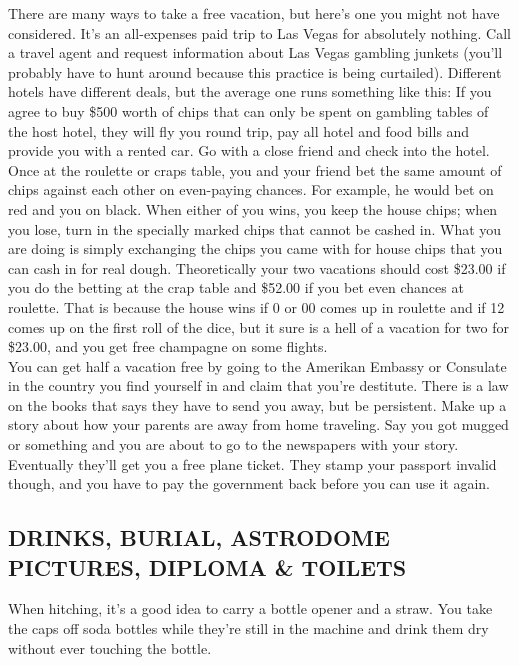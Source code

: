 \documentclass[11pt,twoside,a4paper]{book}
\begin{document}
There are many ways to take a free vacation, but here's one you might not have considered. It's an all-expenses paid trip to Las Vegas for absolutely nothing. Call a travel agent and request information about Las Vegas gambling junkets (you'll probably have to hunt around because this practice is being curtailed). Different hotels have different deals, but the average one runs something like this: If you agree to buy \$500 worth of chips that can only be spent on gambling tables of the host hotel, they will fly you round trip, pay all hotel and food bills and provide you with a rented car. Go with a close friend and check into the hotel. Once at the roulette or craps table, you and your friend bet the same amount of chips against each other on even-paying chances. For example, he would bet on red and you on black. When either of you wins, you keep the house chips; when you lose, turn in the specially marked chips that cannot be cashed in. What you are doing is simply exchanging the chips you came with for house chips that you can cash in for real dough. Theoretically your two vacations should cost \$23.00 if you do the betting at the crap table and \$52.00 if you bet even chances at roulette. That is because the house wins if 0 or 00 comes up in roulette and if 12 comes up on the first roll of the dice, but it sure is a hell of a vacation for two for \$23.00, and you get free champagne on some flights.~\\

You can get half a vacation free by going to the Amerikan Embassy or Consulate in the country you find yourself in and claim that you're destitute.	There is a law on the books that says they have to send you away, but be persistent. Make up a story about how your parents are away from home traveling. Say you got mugged or something and you are about to go to the newspapers with your story. Eventually they'll get you a free plane ticket. They stamp your passport invalid though, and you have to pay the government back before you can use it again.~\\

\subsection{DRINKS, BURIAL, ASTRODOME PICTURES, DIPLOMA \& TOILETS}

When hitching, it's a good idea to carry a bottle opener and a straw. You take the caps off soda bottles while they're still in the machine and drink them dry without ever touching the bottle.~\\
\end{document}

